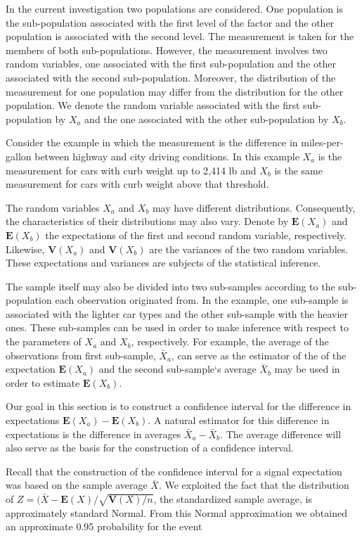 \documentclass[
]{krantz}
\newcommand{\Expec}{\mathbf{E}}
\newcommand{\Var}{\mathbf{V}}
\theoremstyle{definition}
\theoremstyle{definition}
\theoremstyle{definition}
\theoremstyle{remark}
\begin{document}
In the current investigation two populations are considered. One
population is the sub-population associated with the first level of the
factor and the other population is associated with the second level. The
measurement is taken for the members of both sub-populations. However,
the measurement involves two random variables, one associated with the
first sub-population and the other associated with the second
sub-population. Moreover, the distribution of the measurement for one
population may differ from the distribution for the other population. We
denote the random variable associated with the first sub-population by
\(X_a\) and the one associated with the other sub-population by \(X_b\).

Consider the example in which the measurement is the difference in
miles-per-gallon between highway and city driving conditions. In this
example \(X_a\) is the measurement for cars with curb weight up to 2,414
lb and \(X_b\) is the same measurement for cars with curb weight above
that threshold.

The random variables \(X_a\) and \(X_b\) may have different distributions.
Consequently, the characteristics of their distributions may also vary.
Denote by \(\Expec(X_a)\) and \(\Expec(X_b)\) the expectations of the first
and second random variable, respectively. Likewise, \(\Var(X_a)\) and
\(\Var(X_b)\) are the variances of the two random variables. These
expectations and variances are subjects of the statistical inference.

The sample itself may also be divided into two sub-samples according to
the sub-population each observation originated from. In the example, one
sub-sample is associated with the lighter car types and the other
sub-sample with the heavier ones. These sub-samples can be used in order
to make inference with respect to the parameters of \(X_a\) and \(X_b\),
respectively. For example, the average of the observations from first
sub-sample, \(\bar X_a\), can serve as the estimator of the of the
expectation \(\Expec(X_a)\) and the second sub-sample`s average \(\bar X_b\)
may be used in order to estimate \(\Expec(X_b)\).

Our goal in this section is to construct a confidence interval for the
difference in expectations \(\Expec(X_a)-\Expec(X_b)\). A natural
estimator for this difference in expectations is the difference in
averages \(\bar X_a- \bar X_b\). The average difference will also serve as
the basis for the construction of a confidence interval.

Recall that the construction of the confidence interval for a signal
expectation was based on the sample average \(\bar X\). We exploited the
fact that the distribution of
\(Z = (\bar X - \Expec(X)/\sqrt{\Var(X)/n}\), the standardized sample
average, is approximately standard Normal. From this Normal
approximation we obtained an approximate 0.95 probability for the event
\end{document}

